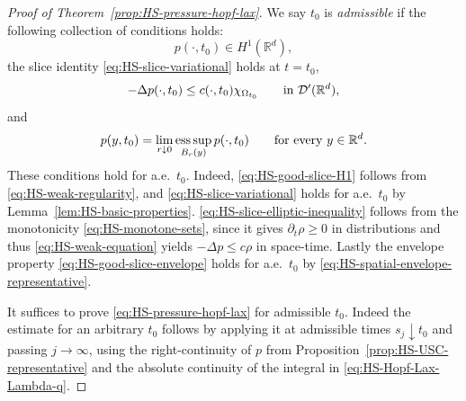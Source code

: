\documentclass[11pt]{amsart}
\numberwithin{equation}{section}
\numberwithin{figure}{section}
\theoremstyle{plain}
\theoremstyle{definition}
\theoremstyle{remark}
\theoremstyle{plain}
\def\R{\mathbb{R}}
\begin{document}
\begin{proof}[Proof of Theorem~\ref{prop:HS-pressure-hopf-lax}]
We say \(t_0\) is {\it admissible} if the following collection of conditions holds:
\begin{equation}\label{eq:HS-good-slice-H1}
    p(\cdot,t_0)\in H^1(\R^d),
\end{equation}
the slice identity \eqref{eq:HS-slice-variational} holds at \(t=t_0\),
\begin{equation}\label{eq:HS-slice-elliptic-inequality}
    -\Delta p(\cdot,t_0)
    \leq c(\cdot,t_0)\chi_{\Omega_{t_0}}
    \qquad\hbox{in }\mathcal D'(\R^d),
\end{equation}
and
\begin{equation}\label{eq:HS-good-slice-envelope}
    p(y,t_0)=\lim_{r\downarrow0}
    \operatorname*{ess\,sup}_{B_r(y)}p(\cdot,t_0)
    \qquad\hbox{for every }y\in\R^d .
\end{equation}
These conditions hold for a.e.\ \(t_0\).  Indeed,
\eqref{eq:HS-good-slice-H1} follows from \eqref{eq:HS-weak-regularity}, and
\eqref{eq:HS-slice-variational} holds for a.e.\ \(t_0\) by
Lemma~\ref{lem:HS-basic-properties}.  
\eqref{eq:HS-slice-elliptic-inequality} follows from the monotonicity
\eqref{eq:HS-monotone-sets}, since it gives \(\partial_t\rho\geq0\) in distributions and thus
\eqref{eq:HS-weak-equation} yields \(-\Delta p\leq c\rho\) in space-time.  Lastly the
 envelope property \eqref{eq:HS-good-slice-envelope} holds for a.e.\
\(t_0\) by \eqref{eq:HS-spatial-envelope-representative}.  


It suffices to prove \eqref{eq:HS-pressure-hopf-lax} for admissible \(t_0\). Indeed the estimate for an arbitrary
\(t_0\) follows  by applying it at admissible
times \(s_j\downarrow t_0\) and passing \(j\to\infty\), using the
right-continuity of \(p\) from Proposition~\ref{prop:HS-USC-representative}
and the absolute continuity of the integral in
\eqref{eq:HS-Hopf-Lax-Lambda-q}.



\end{proof}
\end{document}
